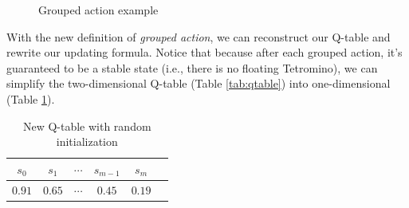 \documentclass[letterpaper]{article} %
\begin{document}
\begin{figure}[t!]
  \centering
  \hfill
  \caption{Grouped action example}
  \label{fig:grouped_action}
\end{figure}

With the new definition of \textit{grouped action}, we can reconstruct our Q-table and rewrite our updating formula. Notice that because after each grouped action, it's guaranteed to be a stable state (i.e., there is no floating Tetromino), we can simplify the two-dimensional Q-table (Table \ref{tab:qtable}) into one-dimensional (Table \ref{tab:newqtable}).

\begin{table}[h!]
  \centering
  \normalsize{
    \begin{tabular}{ |c|c|c|c|c|c| } 
      \hline
      $s_{0}$ & $s_{1}$ & $\cdots$ & $s_{m-1}$ & $s_{m}$  \\ 
      \hline
      $0.91$ & $0.65$ &$\cdots $ &$0.45$ &$0.19$  \\ 
       \hline
      \end{tabular}}
  \caption{New Q-table with random initialization}
  \label{tab:newqtable}
\end{table}
\end{document}
